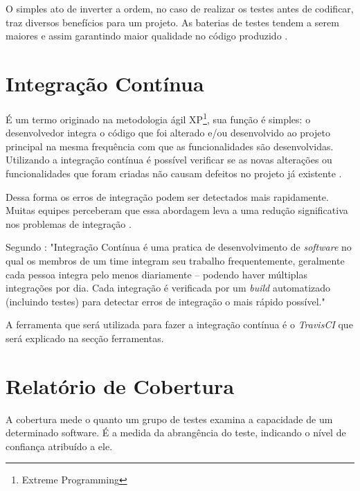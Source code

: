 \par O simples ato de inverter a ordem, no caso de realizar os testes antes de codificar, traz diversos benefícios para um projeto.
As baterias de testes tendem a serem maiores  e assim garantindo maior qualidade no código produzido \cite{tdd2}.


\section{Integração Contínua}

\par É um termo originado na metodologia ágil XP\footnote{Extreme Programming}, sua função é simples: o desenvolvedor integra o código que foi alterado e/ou desenvolvido ao projeto principal na mesma frequência com que as funcionalidades são desenvolvidas. Utilizando a integração contínua é possível verificar se as novas alterações ou funcionalidades que foram criadas não causam defeitos no projeto já existente \cite{integracao}.

\newpage
\par Dessa forma os erros de integração podem ser detectados mais rapidamente. Muitas equipes perceberam que essa abordagem leva a uma redução significativa nos problemas de integração \cite{integracao} . 
\begin{citacao}

\par Segundo : "Integração Contínua é uma pratica de desenvolvimento de \textit{software} no qual os membros de um time integram seu trabalho frequentemente, geralmente cada pessoa integra pelo menos diariamente – podendo haver múltiplas integrações por dia. Cada integração é verificada por um \textit{build} automatizado (incluindo testes) para detectar erros de integração o mais rápido possível."
\end{citacao}

\par A ferramenta que será utilizada para fazer a integração contínua é o \textit{TravisCI} que será explicado na secção ferramentas.




\section{Relatório de Cobertura}

\par A cobertura mede o quanto um grupo de testes examina a capacidade de um determinado software. É a medida da abrangência do teste, indicando o nível de confiança atribuído a ele.

